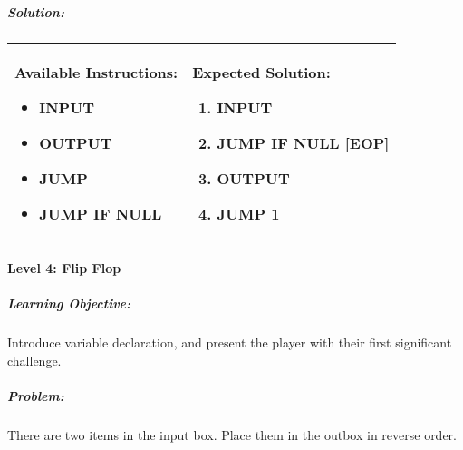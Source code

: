 \subparagraph{Solution:} 
\begin{center}
    \begin{tabular}{ | m{5cm} | m{9cm} | } 
        \hline
            \textbf{Available Instructions:} 
            \begin{itemize}
                \setlength\itemsep{-.35em}
                \item INPUT
                \item OUTPUT
                \item JUMP
                \item JUMP IF NULL
            \end{itemize}& 
            \textbf{Expected Solution:} 
            \begin{enumerate}
                \setlength\itemsep{-.35em}
                \item INPUT
                \item JUMP IF NULL [EOP]
                \item OUTPUT
                \item JUMP 1
            \end{enumerate}
            \\
        \hline
    \end{tabular}
\end{center}

\paragraph{Level 4: Flip Flop}
\subparagraph{Learning Objective:} Introduce variable declaration, and present 
the player with their first significant challenge.

\subparagraph{Problem:} There are two items in the input box. Place them in the 
outbox in reverse order.

